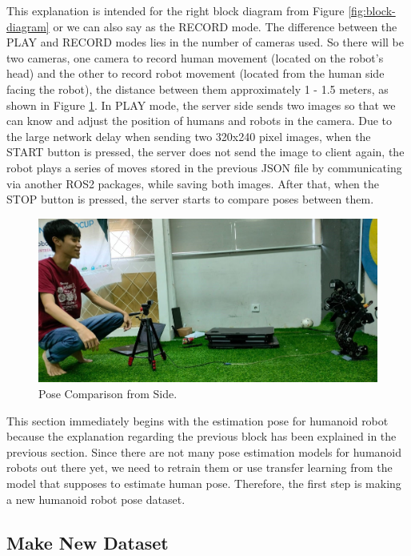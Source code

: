 This explanation is intended for the right block diagram from Figure \ref{fig:block-diagram} or we can also say as the RECORD mode. The difference between the PLAY and RECORD modes lies in the number of cameras used.
So there will be two cameras, one camera to record human movement (located on the robot's head) and the other to record robot movement (located from the human side facing the robot), the distance between them approximately 1 - 1.5 meters, as shown in Figure \ref{fig:pose-comparison-side}.
In PLAY mode, the server side sends two images so that we can know and adjust the position of humans and robots in the camera. Due to the large network delay when sending two 320x240 pixel images, when the START button is pressed,
the server does not send the image to client again, the robot plays a series of moves stored in the previous JSON file by communicating via another ROS2 packages, while saving both images. After that, when the STOP button is pressed, the server starts to compare poses between them.
\begin{figure}[ht]
  \centering
  \includegraphics[scale=0.3]{gambar/pose-comparison.jpeg}
  \caption{Pose Comparison from Side.}
  \label{fig:pose-comparison-side}
\end{figure}

This section immediately begins with the estimation pose for humanoid robot because the explanation regarding the previous block has been explained in the previous section.
Since there are not many pose estimation models for humanoid robots out there yet, we need to retrain them or use transfer learning from the model that supposes to estimate human pose.
Therefore, the first step is making a new humanoid robot pose dataset.

\subsection{Make New Dataset}
\label{subsec:make-new-dataset}

